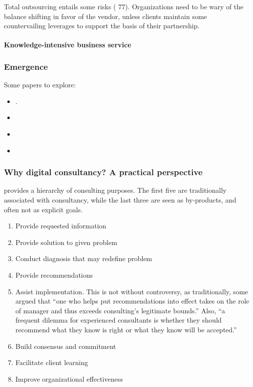 \documentclass[12pt]{article}
\providecommand{\tightlist}{%
  \setlength{\itemsep}{0pt}\setlength{\parskip}{0pt}}
\begin{document}
Total outsourcing entails some risks (\citet{willcocks1995} 77).
Organizations need to be wary of the balance shifting in favor of the
vendor, unless clients maintain some countervailing leverages to support
the basis of their partnership.

\hypertarget{knowledge-intensive-business-service}{%
\paragraph{Knowledge-intensive business
service}\label{knowledge-intensive-business-service}}

\hypertarget{emergence}{%
\subsubsection{Emergence}\label{emergence}}

Some papers to explore:

\begin{itemize}
\tightlist
\item
  \citep[ 120-130]{armbruster2006}.
\item
  \citep{kipping2002}
\item
  \citep[ 336]{fincham1999}
\item
  \citep{mckenna2006}
\end{itemize}

\hypertarget{why-digital-consultancy-a-practical-perspective}{%
\subsubsection{Why digital consultancy? A practical
perspective}\label{why-digital-consultancy-a-practical-perspective}}

\citet{turner1982} provides a hierarchy of consulting purposes. The
first five are traditionally associated with consultancy, while the last
three are seen as by-products, and often not as explicit goals.

\begin{enumerate}
\def\labelenumi{\arabic{enumi}.}
\tightlist
\item
  Provide requested information
\item
  Provide solution to given problem
\item
  Conduct diagnosis that may redefine problem
\item
  Provide recommendations
\item
  Assist implementation. This is not without controversy, as
  traditionally, some argued that ``one who helps put recommendations
  into effect takes on the role of manager and thus exceeds consulting's
  legitimate bounds.'' Also, ``a frequent dilemma for experienced
  consultants is whether they should recommend what they know is right
  or what they know will be accepted.''
\item
  Build consensus and commitment
\item
  Facilitate client learning
\item
  Improve organizational effectiveness
\end{enumerate}
\end{document}
